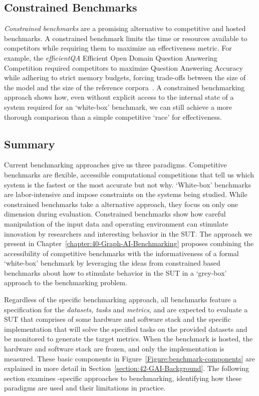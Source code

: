 \subsection{Constrained Benchmarks}
\textit{Constrained benchmarks} are a promising alternative to competitive and hosted benchmarks.
A constrained benchmark limits the time or resources available to competitors while requiring them to maximize an effectiveness metric.
For example, the \textit{efficientQA} Efficient Open Domain Question Answering Competition required competitors to maximize Question Answering Accuracy while adhering to strict memory budgets, forcing trade-offs between the size of the model and the size of the reference corpora~\cite{Min2020}. 
A constrained benchmarking approach shows how, even without explicit access to the internal state of a system required for an `white-box' benchmark, we can still achieve a more thorough comparison than a simple competitive `race' for effectiveness.

\subsection{Summary}
Current benchmarking approaches give us three paradigms.
Competitive benchmarks are flexible, accessible computational competitions that tell us which system is the fastest or the most accurate but not why. 
`White-box' benchmarks are labor-intensive and impose constraints on the systems being studied. 
While constrained benchmarks take a alternative approach, they focus on only one dimension during evaluation. 
Constrained benchmarks show how careful manipulation of the input data and operating environment can stimulate innovation by researchers and interesting behavior in the \ac{SUT}.
The approach we present in Chapter~\ref{chapter:40-Graph-AI-Benchmarking} proposes combining the accessibility of competitive benchmarks with the informativeness of a formal `white-box' benchmark by leveraging the ideas from 
constrained based benchmarks about how to stimulate behavior in the \ac{SUT} in a `grey-box' approach to the benchmarking problem. 



Regardless of the specific benchmarking approach, all benchmarks feature a specification for the \textit{datasets, tasks} and \textit{metrics}, and are expected to evaluate a \ac{SUT} that comprises of some hardware and software stack and the specific implementation that will solve the specified tasks on the provided datasets and be monitored to generate the target metrics. 
When the benchmark is hosted, the hardware and software stack are frozen, and only the implementation is measured.
These basic components in Figure~\ref{Figure:benchmark-components} are explained in more detail in Section~\ref{section:42-GAI-Background}.
The following section examines \gai-specific approaches to benchmarking, identifying how these paradigms are used and their limitations in practice. 


